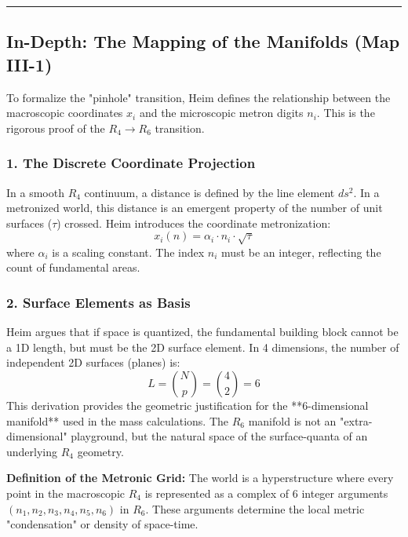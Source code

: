 \documentclass[11pt,a4paper,oneside]{article}
\newcommand{\hr}{\par\vspace{2em}\noindent\rule{\linewidth}{0.4pt}\par\vspace{2em}}
\begin{document}
\hr

\subsection*{In-Depth: The Mapping of the Manifolds (Map III-1)}

To formalize the "pinhole" transition, Heim defines the relationship between the macroscopic coordinates $x_i$ and the microscopic metron digits $n_i$. This is the rigorous proof of the $R_4 \to R_6$ transition.

\subsubsection*{1. The Discrete Coordinate Projection}
In a smooth $R_4$ continuum, a distance is defined by the line element $ds^2$. In a metronized world, this distance is an emergent property of the number of unit surfaces ($\tau$) crossed. Heim introduces the coordinate metronization:
\begin{equation}
    x_i(n) = \alpha_i \cdot n_i \cdot \sqrt{\tau}
\end{equation}
where $\alpha_i$ is a scaling constant. The index $n_i$ must be an integer, reflecting the count of fundamental areas.

\subsubsection*{2. Surface Elements as Basis}
Heim argues that if space is quantized, the fundamental building block cannot be a 1D length, but must be the 2D surface element. In 4 dimensions, the number of independent 2D surfaces (planes) is:
\begin{equation}
    L = \binom{N}{p} = \binom{4}{2} = 6
\end{equation}
This derivation provides the geometric justification for the **6-dimensional manifold** used in the mass calculations. The $R_6$ manifold is not an "extra-dimensional" playground, but the natural space of the surface-quanta of an underlying $R_4$ geometry.

\begin{mbbcite}
    \textbf{Definition of the Metronic Grid:} The world is a hyperstructure where every point in the macroscopic $R_4$ is represented as a complex of 6 integer arguments $(n_1, n_2, n_3, n_4, n_5, n_6)$ in $R_6$. These arguments determine the local metric "condensation" or density of space-time.
\end{mbbcite}
\end{document}
